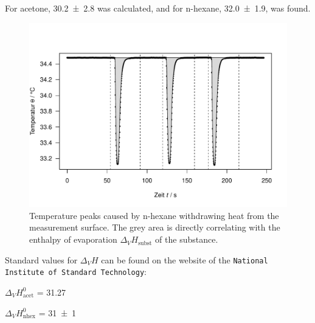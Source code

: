 For acetone, \qty{30.2 \pm 2.8}{\kJpmole} was calculated, and for n-hexane, \qty{32.0 \pm 1.9}{\kJpmole}, was found.

\begin{figure}[H]
    \centering
    \includegraphics[width=.5\textwidth]{figures/n-hexane.pdf}
    \caption{Temperature peaks caused by n-hexane withdrawing heat from the measurement surface. The grey area is directly correlating with the enthalpy of evaporation $\Delta_VH_{\text{subst}}$ of the substance.}
    \label{fig:nhex_peaks}
\end{figure}

Standard values for $\Delta_VH$ can be found on the website of the \texttt{National Institute of Standard Technology}:

$\Delta_VH^0_{\text{acet}}$ = \qty{31.27}{\kJpmole} \cite{NIST:acet}

$\Delta_VH^0_{\text{nhex}}$ = \qty{31\pm 1}{\kJpmole} \cite{NIST:nhex}

